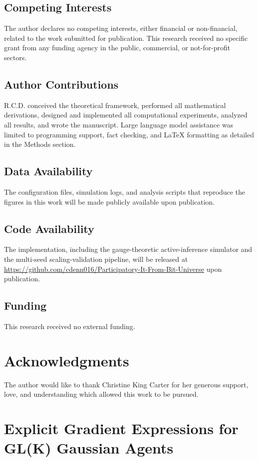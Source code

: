 \documentclass[11pt]{article}
\newenvironment{acknowledgments}
  {\section*{Acknowledgments}}
  {}
\begin{document}
\subsection*{Competing Interests}
The author declares no competing interests, either financial or non-financial, related to the work submitted for publication. This research received no specific grant from any funding agency in the public, commercial, or not-for-profit sectors.

\subsection*{Author Contributions}
R.C.D. conceived the theoretical framework, performed all mathematical derivations, designed and implemented all computational experiments, analyzed all results, and wrote the manuscript. Large language model assistance was limited to programming support, fact checking, and LaTeX formatting as detailed in the Methods section.

\subsection*{Data Availability}
The configuration files, simulation logs, and analysis scripts that reproduce the figures in this work will be made publicly available upon publication.

\subsection*{Code Availability}
The implementation, including the gauge-theoretic active-inference simulator and the multi-seed scaling-validation pipeline, will be released at \url{https://github.com/cdenn016/Participatory-It-From-Bit-Universe} upon publication.

\subsection*{Funding}
This research received no external funding.

\begin{acknowledgments}
The author would like to thank Christine King Carter for her generous support, love, and understanding which allowed this work to be pursued.
\end{acknowledgments}

\appendix

\section*{Explicit Gradient Expressions for GL(K) Gaussian Agents}
\end{document}
